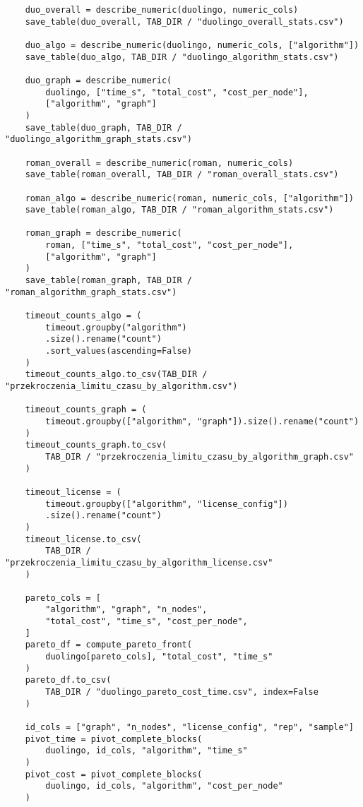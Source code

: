 {\begin{verbatim}
    duo_overall = describe_numeric(duolingo, numeric_cols)
    save_table(duo_overall, TAB_DIR / "duolingo_overall_stats.csv")

    duo_algo = describe_numeric(duolingo, numeric_cols, ["algorithm"])
    save_table(duo_algo, TAB_DIR / "duolingo_algorithm_stats.csv")

    duo_graph = describe_numeric(
        duolingo, ["time_s", "total_cost", "cost_per_node"],
        ["algorithm", "graph"]
    )
    save_table(duo_graph, TAB_DIR / "duolingo_algorithm_graph_stats.csv")

    roman_overall = describe_numeric(roman, numeric_cols)
    save_table(roman_overall, TAB_DIR / "roman_overall_stats.csv")

    roman_algo = describe_numeric(roman, numeric_cols, ["algorithm"])
    save_table(roman_algo, TAB_DIR / "roman_algorithm_stats.csv")

    roman_graph = describe_numeric(
        roman, ["time_s", "total_cost", "cost_per_node"],
        ["algorithm", "graph"]
    )
    save_table(roman_graph, TAB_DIR / "roman_algorithm_graph_stats.csv")

    timeout_counts_algo = (
        timeout.groupby("algorithm")
        .size().rename("count")
        .sort_values(ascending=False)
    )
    timeout_counts_algo.to_csv(TAB_DIR / "przekroczenia_limitu_czasu_by_algorithm.csv")

    timeout_counts_graph = (
        timeout.groupby(["algorithm", "graph"]).size().rename("count")
    )
    timeout_counts_graph.to_csv(
        TAB_DIR / "przekroczenia_limitu_czasu_by_algorithm_graph.csv"
    )

    timeout_license = (
        timeout.groupby(["algorithm", "license_config"])
        .size().rename("count")
    )
    timeout_license.to_csv(
        TAB_DIR / "przekroczenia_limitu_czasu_by_algorithm_license.csv"
    )

    pareto_cols = [
        "algorithm", "graph", "n_nodes",
        "total_cost", "time_s", "cost_per_node",
    ]
    pareto_df = compute_pareto_front(
        duolingo[pareto_cols], "total_cost", "time_s"
    )
    pareto_df.to_csv(
        TAB_DIR / "duolingo_pareto_cost_time.csv", index=False
    )

    id_cols = ["graph", "n_nodes", "license_config", "rep", "sample"]
    pivot_time = pivot_complete_blocks(
        duolingo, id_cols, "algorithm", "time_s"
    )
    pivot_cost = pivot_complete_blocks(
        duolingo, id_cols, "algorithm", "cost_per_node"
    )


\end{verbatim}}
